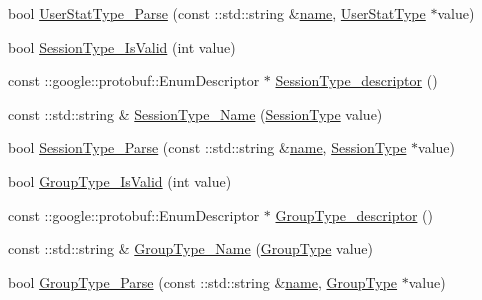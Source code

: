 \begin{DoxyCompactItemize}
\item 
bool \hyperlink{namespace_i_m_1_1_base_define_ac1cb7b8945fc2866e085d5508c4ac8d8}{User\+Stat\+Type\+\_\+\+Parse} (const \+::std\+::string \&\hyperlink{http__parser_8c_a8f8f80d37794cde9472343e4487ba3eb}{name}, \hyperlink{namespace_i_m_1_1_base_define_adaf1a78b7a7db0195b92cc1786d93c01}{User\+Stat\+Type} $\ast$value)
\item 
bool \hyperlink{namespace_i_m_1_1_base_define_a63e0a1a9b531893139ed2b64c58d671c}{Session\+Type\+\_\+\+Is\+Valid} (int value)
\item 
const \+::google\+::protobuf\+::\+Enum\+Descriptor $\ast$ \hyperlink{namespace_i_m_1_1_base_define_a98d1cfb35d7643380d26b57bd1c577fe}{Session\+Type\+\_\+descriptor} ()
\item 
const \+::std\+::string \& \hyperlink{namespace_i_m_1_1_base_define_a3e97664c3d12642b0601313013c0e778}{Session\+Type\+\_\+\+Name} (\hyperlink{namespace_i_m_1_1_base_define_a8664333f4d4e362384376a56d29222c6}{Session\+Type} value)
\item 
bool \hyperlink{namespace_i_m_1_1_base_define_ab4b849e5b14eaf3d4413bae22e0b7d18}{Session\+Type\+\_\+\+Parse} (const \+::std\+::string \&\hyperlink{http__parser_8c_a8f8f80d37794cde9472343e4487ba3eb}{name}, \hyperlink{namespace_i_m_1_1_base_define_a8664333f4d4e362384376a56d29222c6}{Session\+Type} $\ast$value)
\item 
bool \hyperlink{namespace_i_m_1_1_base_define_a297334c8962d0d447993e5bd6741ba9a}{Group\+Type\+\_\+\+Is\+Valid} (int value)
\item 
const \+::google\+::protobuf\+::\+Enum\+Descriptor $\ast$ \hyperlink{namespace_i_m_1_1_base_define_a20e0b27541b494382fae7e74c624507b}{Group\+Type\+\_\+descriptor} ()
\item 
const \+::std\+::string \& \hyperlink{namespace_i_m_1_1_base_define_aa98bbf929226ca31a04d0f3a75beb1ea}{Group\+Type\+\_\+\+Name} (\hyperlink{namespace_i_m_1_1_base_define_a6ca6b4875848a9b5da46c019cf9b7d63}{Group\+Type} value)
\item 
bool \hyperlink{namespace_i_m_1_1_base_define_a167b2eae532a5372b26374c972f50494}{Group\+Type\+\_\+\+Parse} (const \+::std\+::string \&\hyperlink{http__parser_8c_a8f8f80d37794cde9472343e4487ba3eb}{name}, \hyperlink{namespace_i_m_1_1_base_define_a6ca6b4875848a9b5da46c019cf9b7d63}{Group\+Type} $\ast$value)
\end{DoxyCompactItemize}
